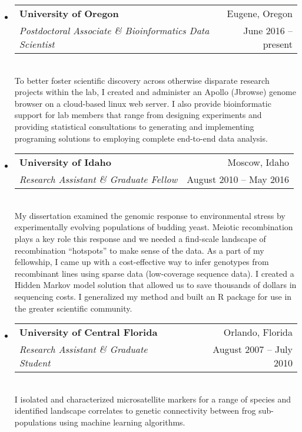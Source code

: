 \documentclass[11pt,letterpaper,sans]{moderncv}        %
\begin{document}
\begin{itemize}

\item{
\centering
  \begin{tabular}{p{15cm}r}
\textbf{University of Oregon} & Eugene, Oregon\\
\textit{Postdoctoral Associate \& Bioinformatics Data Scientist} & June 2016 -- present \\
  \end{tabular}
}
\\
To better foster scientific discovery across otherwise disparate research projects within the lab, I created and administer an Apollo (Jbrowse) genome browser on a cloud-based linux web server. I also provide bioinformatic support for lab members that range from designing experiments and providing statistical consultations to generating and implementing programing solutions to employing complete end-to-end data analysis.
\vspace{4pt}

\item{
\centering
  \begin{tabular}{p{14.2cm}r}
\textbf{University of Idaho} & Moscow, Idaho\\
\textit{Research Assistant \& Graduate Fellow} & August 2010 -- May 2016 \\
  \end{tabular}
}
\\
My dissertation examined the genomic response to environmental stress by experimentally evolving populations of budding yeast. Meiotic recombination plays a key role this response and we needed a find-scale landscape of recombination ``hotspots'' to make sense of the data. As a part of  my fellowship, I came up with a cost-effective way to infer genotypes from recombinant lines using sparse data (low-coverage sequence data). I created a Hidden Markov model solution that allowed us to save thousands of dollars in sequencing costs. I generalized my method and built an R package for use in the greater scientific community. 
\vspace{4pt}

\item{
\centering
  \begin{tabular}{p{14.2cm}r}
\textbf{University of Central Florida} & Orlando, Florida \\
\textit{Research Assistant \& Graduate Student} & August 2007 -- July 2010 \\
  \end{tabular}
}
\\
I isolated and characterized microsatellite markers for a range of species and identified landscape correlates to genetic connectivity between frog sub-populations using machine learning algorithms.

\end{itemize}
\end{document}
